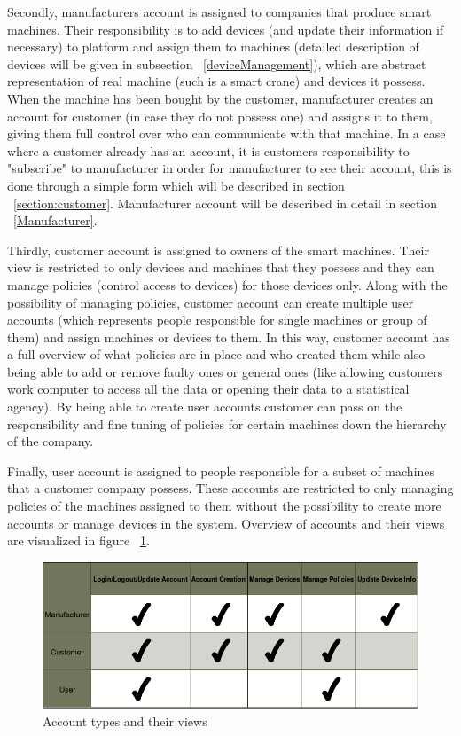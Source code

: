 Secondly, manufacturers account is assigned to companies that produce smart machines. Their responsibility is to add devices (and update their information if necessary) to platform and assign them to machines (detailed description of devices will be given in subsection ~\ref{deviceManagement}), which are abstract representation of real machine (such is a smart crane) and devices it possess. When the machine has been bought by the customer, manufacturer creates an account for customer (in case they do not possess one) and assigns it to them, giving them full control over who can communicate with that machine. In a case where a customer already has an account, it is customers responsibility to "subscribe" to manufacturer in order for manufacturer to see their account, this is done through a simple form which will be described in section ~\ref{section:customer}. Manufacturer account will be described in detail in section ~\ref{Manufacturer}.

Thirdly, customer account is assigned to owners of the smart machines. Their view is restricted to only devices and machines that they possess and they can manage policies (control access to devices) for those devices only. Along with the possibility of managing policies, customer account can create multiple user accounts (which represents people responsible for single machines or group of them) and assign machines or devices to them. In this way, customer account has a full overview of what policies are in place and who created them while also being able to add or remove faulty ones or general ones (like allowing customers work computer to access all the data or opening their data to a statistical agency). By being able to create user accounts customer can pass on the responsibility and fine tuning of policies for certain machines down the hierarchy of the company.

Finally, user account is assigned to people responsible for a subset of machines that a customer company possess. These accounts are restricted to only managing policies of the machines assigned to them without the possibility to create more accounts or manage devices in the system. Overview of accounts and their views are visualized in figure ~\ref{fig:accountTypes}.

\begin{figure}[ht]
	\begin{center}
		\includegraphics[width=\textwidth]{images/Functionalities}
		\caption{Account types and their views}
		\label{fig:accountTypes}
	\end{center}
\end{figure}

